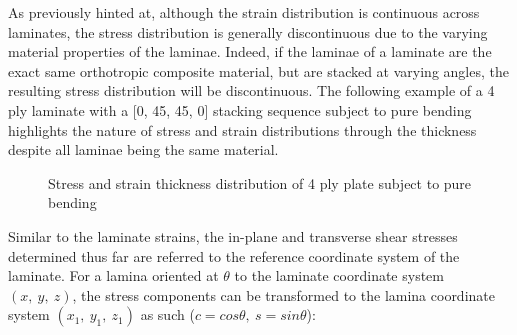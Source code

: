 As previously hinted at, although the strain distribution is continuous across laminates, the stress distribution is generally discontinuous due to the varying material properties of the laminae. Indeed, if the laminae of a laminate are the exact same orthotropic composite material, but are stacked at varying angles, the resulting stress distribution will be discontinuous. The following example of a 4 ply laminate with a [0, 45, 45, 0] stacking sequence subject to pure bending highlights the nature of stress and strain distributions through the thickness despite all laminae being the same material.

\begin{figure}[H]
	\caption{\label{composite_stress_strain}Stress and strain thickness distribution of 4 ply plate subject to pure bending  \cite{nasanettles1994}}
\end{figure}

Similar to the laminate strains, the in-plane and transverse shear stresses determined thus far are referred to the reference coordinate system of the laminate. For a lamina oriented at $\theta$ to the laminate coordinate system $(x,\ y,\ z)$, the stress components can be transformed to the lamina coordinate system $(x_1,\ y_1,\ z_1)$ as such ($c = cos\theta,\ s = sin\theta$):

